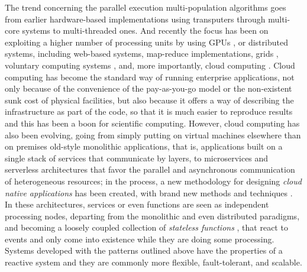 \documentclass[review]{elsarticle}
\begin{document}
The trend concerning the parallel execution multi-population algorithms goes from
earlier hardware-based implementations using transputers
\cite{gorges1990explicit} through 
multi-core systems \cite{Serrano2008,lai2019adaptive} to multi-threaded \cite{merelo2019scaling} ones.
And recently the focus has been on exploiting a higher number of processing
units by using GPUs \cite{tan2015survey,li2007efficient}, or distributed
systems, including web-based \cite{JSON} systems,
map-reduce \cite{fazenda2012} implementations,  grids \cite{munawar2010design,Gonzalez09},
voluntary computing systems \cite{MilkyWay}, %
and, more importantly, cloud computing
\cite{GValdez2015,salza2019speed,valenzuela2015implementing,FlexGP}. Cloud computing has become the standard way of running
enterprise applications, not only because of the convenience of the
pay-as-you-go model or the non-existent sunk cost of physical facilities, but also because
it offers a way of describing the infrastructure as part of the code, so that it
is much easier to reproduce results and this has been a boon for scientific
computing.  However,  cloud computing has also been evolving, going from simply
putting on virtual machines elsewhere than on premises old-style monolithic applications, that is, applications
built on a single stack of services that communicate by layers, to microservices
\cite{microservices} and serverless architectures \cite{varghese2018next,Varghese2018849} that favor the parallel and asynchronous communication of
heterogeneous resources; in the process, a new methodology for designing {\em cloud
native applications} has been created, with brand new methods and
techniques \cite{Baldini2016287}. In these architectures, services or even
functions are seen as independent processing nodes, departing from the monolithic
and even distributed paradigms, and becoming a loosely coupled collection of {\em
stateless functions} \cite{malawski2017serverless}, that react to events and
only come into existence while they are doing some processing.
Systems developed with the patterns outlined above have the
properties of a reactive system \cite{boner2014reactive} and they are commonly
more flexible, fault-tolerant, and scalable. %
\end{document}
